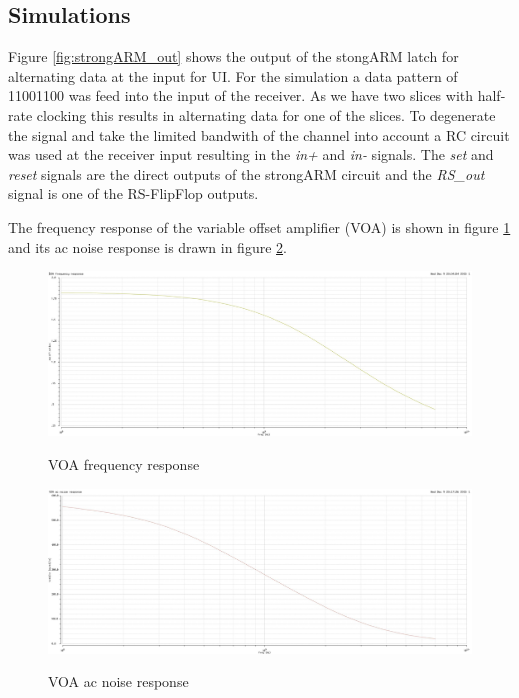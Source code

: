 \subsection{Simulations}
\label{sec:simulations}
Figure \ref{fig:strongARM_out} shows the output of the stongARM latch for alternating data at the input for \unit[6]{UI}. For the simulation a data pattern of 11001100 was feed into the input of the receiver. As we have two slices with half-rate clocking this results in alternating data for one of the slices. To degenerate the signal and take the limited bandwith of the channel into account a RC circuit was used at the receiver input resulting in the \textit{in+} and \textit{in-} signals. The \textit{set} and \textit{reset} signals are the direct outputs of the strongARM circuit and the \textit{RS\_out} signal is one of the RS-FlipFlop outputs.

The frequency response of the variable offset amplifier (VOA) is shown in figure \ref{fig:voa_freq} and its ac noise response is drawn in figure \ref{fig:voa_noise}.

\begin{figure}[H]
  \centering
  {\includegraphics[scale=0.35]{img/voa_freq.jpg}}
  \caption{VOA frequency response}
  \label{fig:voa_freq}
\end{figure}

\begin{figure}[H]
  \centering
  {\includegraphics[scale=0.35]{img/voa_noise.jpg}}
  \caption{VOA ac noise response}
  \label{fig:voa_noise}
\end{figure}

